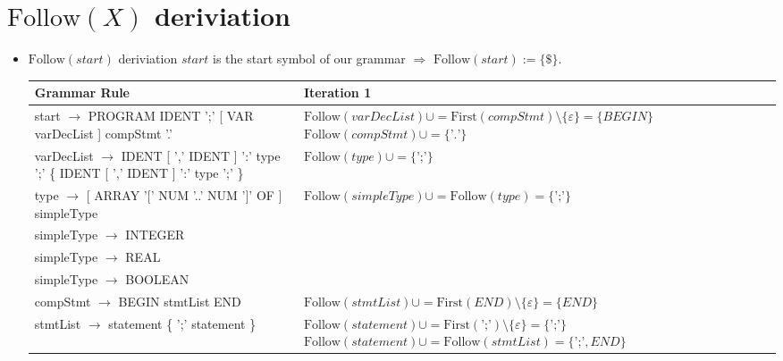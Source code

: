 \documentclass[8pt]{scrartcl}
\newcommand{\First}[1]{\mathrm{First}(#1)}
\newcommand{\Follow}[1]{\mathrm{Follow}(#1)}
\newcommand{\epsset}{\{\varepsilon\}}
\begin{document}
    \section{$\Follow{X}$ \textbf{deriviation}}
        \begin{itemize}
            \item $\Follow{start}$ deriviation\newline
                $start$ is the start symbol of our grammar $\Rightarrow$ $\Follow{start} := \{\$\}$.\newline
                \begin{tabular}{|l|l|}
                    \hline
                    \textbf{Grammar Rule} & \textbf{Iteration 1}\\
                    \hline
                    start $\rightarrow$ PROGRAM IDENT ';' [ VAR varDecList ] compStmt '.' & \makecell[l]{$\Follow{varDecList} \cup = \First{compStmt} \setminus \epsset = \{BEGIN\}$\\
                                                                                     $\Follow{compStmt} \cup = \{\text{'.'}\}$
                                                                                    }\\
                    \hline
                    \makecell[l]{varDecList $\rightarrow$ IDENT [ ',' IDENT ]\\ ':' type ';' \{ IDENT [ ',' IDENT ] ':' type ';' \}} & $\Follow{type} \cup = \{\text{';'}\}$\\
                    \hline
                    type $\rightarrow$ [ ARRAY '$[$' NUM '..' NUM '$]$' OF ] simpleType & $\Follow{simpleType} \cup = \Follow{type} = \{\text{';'\}}$\\
                    \hline
                    simpleType $\rightarrow$ INTEGER &\\
                    \hline
                    simpleType $\rightarrow$ REAL &\\
                    \hline
                    simpleType $\rightarrow$ BOOLEAN &\\
                    \hline
                    compStmt $\rightarrow$ BEGIN stmtList END & $\Follow{stmtList} \cup = \First{END} \setminus \epsset = \{END\}$\\
                    \hline
                    stmtList $\rightarrow$ statement \{ ';' statement \} & \makecell[l]{$\Follow{statement} \cup = \First{\text{';'}}\setminus \epsset = \{\text{';'}\}$\\ $\Follow{statement} \cup = \Follow{stmtList} = \{\text{';'}, END\}$}\\

\end{tabular}
\end{itemize}
\end{document}
